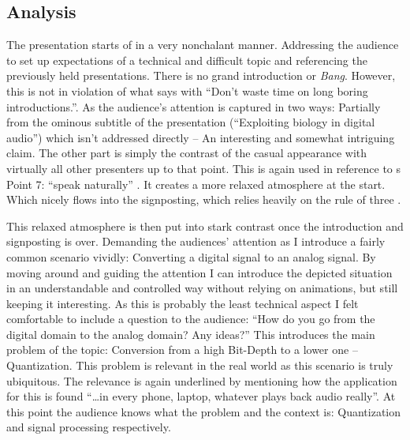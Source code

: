 \subsection{Analysis}


The presentation starts of in a very nonchalant manner.
Addressing the audience to set up expectations of a technical and difficult topic and referencing the previously held presentations.
There is no grand introduction or \textit{Bang}.
However, this is not in violation of what \citeauthor{powell2011presenting} says with \enquote{Don't waste time on long boring introductions.}\autocite[Point 3 on Page 7]{powell2011presenting}.
As the audience's attention is captured in two ways:
Partially from the ominous subtitle of the presentation (\enquote{Exploiting biology in digital audio}) which isn't addressed directly -- An interesting and somewhat intriguing claim.
The other part is simply the contrast of the casual appearance with virtually all other presenters up to that point.
This is again used in reference to \citeauthor{powell2011presenting}s Point 7: \enquote{speak naturally} \autocite[Page 7]{powell2011presenting}.
It creates a more relaxed atmosphere at the start.
Which nicely flows into the signposting, which relies heavily on the rule of three \autocite[Page 59, A]{williams2008presentations}.

This relaxed atmosphere is then put into stark contrast once the introduction and signposting is over.
Demanding the audiences' attention as I introduce a fairly common scenario vividly: Converting a digital signal to an analog signal.
By moving around and guiding the attention I can introduce the depicted situation in an understandable and controlled way without relying on animations, but still keeping it interesting.
As this is probably the least technical aspect I felt comfortable to include a question to the audience:
\enquote{How do you go from the digital domain to the analog domain? Any ideas?}
This introduces the main problem of the topic: Conversion from a high Bit-Depth to a lower one -- Quantization.
This problem is relevant in the real world as this scenario is truly ubiquitous.
The relevance is again underlined by mentioning how the application for this is found \enquote{\ldots in every phone, laptop, whatever plays back audio really}.
At this point the audience knows what the problem and the context is: Quantization and signal processing respectively.

